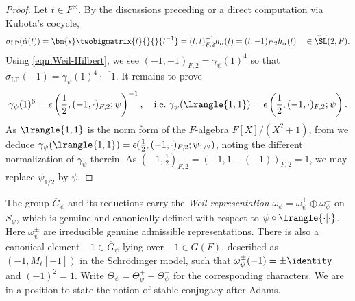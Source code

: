 \documentclass[a4paper,10pt]{article}
\begin{document}
\begin{proof}
	Let $t \in F^\times$. By the discussions preceding \cite[Corollaire 5.12]{Mat69} or a direct computation via Kubota's cocycle,
	\[ \sigma_\text{LP}(\check{\alpha}(t)) = \bm{s}\twobigmatrix{t}{}{}{t^{-1}} = (t,t)_{F,2}^{-1} h_\alpha(t) = (t,-1)_{F,2} h_\alpha(t)  \quad \in \widetilde{\SL}(2,F). \]
	Using \eqref{eqn:Weil-Hilbert}, we see $(-1,-1)_{F,2} = \gamma_\psi(1)^4$ so that $\sigma_\text{LP}(-1) = \gamma_\psi(1)^4 \cdot \overline{-1}$. It remains to prove
	\[ \gamma_\psi(1)^6 = \epsilon\left( \frac{1}{2}, (-1, \cdot)_{F,2}; \psi\right)^{-1}, \quad \text{i.e.}\; \gamma_\psi(\lrangle{1,1}) = \epsilon\left( \frac{1}{2}, (-1, \cdot)_{F,2}; \psi\right). \]
	As $\lrangle{1,1}$ is the norm form of the $F$-algebra $F[X]/(X^2+1)$, from \cite[Lemma 1.2]{JL70} we deduce $\gamma_\psi(\lrangle{1,1}) = \epsilon(\frac{1}{2}, (-1, \cdot)_{F,2}; \psi_{1/2})$, noting the different normalization of $\gamma_\psi$ therein. As $(-1, \frac{1}{2})_{F,2} = (-1, 1-(-1))_{F,2} = 1$, we may replace $\psi_{1/2}$ by $\psi$.
\end{proof}

The group $\overline{G}_\psi$ and its reductions carry the \emph{Weil representation} $\omega_\psi = \omega_\psi^+ \oplus \omega_\psi^-$ on $S_\psi$, which is genuine and canonically defined with respect to $\psi \circ \lrangle{\cdot|\cdot}$. Here $\omega_\psi^\pm$ are irreducible genuine admissible representations. There is also a canonical element $-1 \in \overline{G}_\psi$ lying over $-1 \in G(F)$, described as $(-1, M_\ell[-1])$ in the Schrödinger model, such that $\omega_\psi^\pm(-1) = \pm \identity$ and $(-1)^2 = 1$. Write $\Theta_\psi = \Theta_\psi^+ + \Theta_\psi^-$ for the corresponding characters. We are in a position to state the notion of stable conjugacy after Adams.
\end{document}
